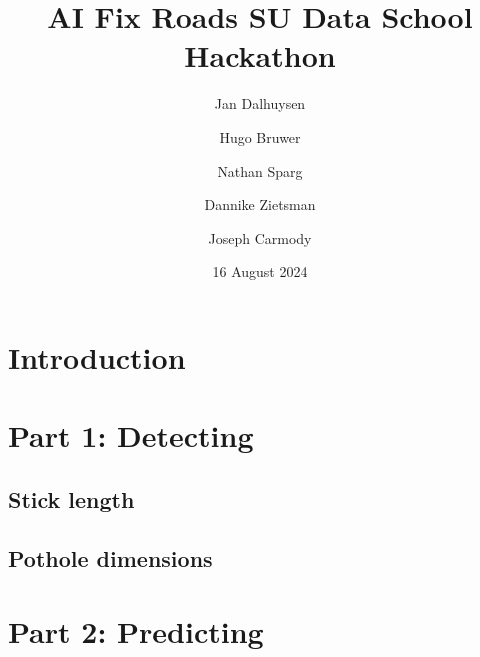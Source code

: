 \documentclass{article}
\title{AI Fix Roads SU Data School Hackathon}
\author{Jan Dalhuysen \and Hugo Bruwer \and Nathan Sparg \and Dannike Zietsman \and Joseph Carmody}
\date{16 August 2024}
\begin{document}
\maketitle

\section{Introduction}

\newpage

\section{Part 1: Detecting}

\subsection{Stick length}

\subsection{Pothole dimensions}

\section{Part 2: Predicting}



\end{document}
